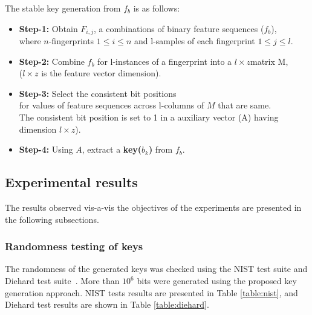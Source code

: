 The stable key generation from $f_{b}$ is as follows:
\begin{itemize}
	\item \textbf{Step-1:} Obtain ${F_{i,j}}$, a combinations of binary feature
	      sequences ($f_{b}$), \\
		  where $n$-fingerprints $1 \leq i \leq n $ and l-samples of each fingerprint $1 \leq j \leq l $.
	\item \textbf{Step-2:} Combine $f_{b}$ for l-instances of a fingerprint into a $l\times z$matrix M, \\
		  ($l\times z$ is the feature vector dimension).
	\item \textbf{Step-3:} Select the consistent bit positions \\
		  for values of feature sequences across l-columns of $M$ that are same. \\
		  The consistent bit position is set to 1 in a auxiliary vector (A) having dimension $l\times z$).
	\item \textbf{Step-4:} Using $A$, extract a \textbf{key($b_{k}$)} from $f_{b}$.
\end{itemize}



\subsection{Experimental results }
\noindent The results observed vis-a-vis the objectives of the experiments are
presented in the following subsections.


\subsubsection{Randomness testing of keys}
\noindent The randomness of the generated keys was checked using the NIST test
suite \cite{pareschi2012statistical} and Diehard test
suite~\cite{marsaglia1998diehard}. More than $10^6$ bits were generated using
the proposed key generation approach. NIST tests results are presented in Table
\ref{table:nist}, and Diehard test results are shown in Table
\ref{table:diehard}. 

\par 


